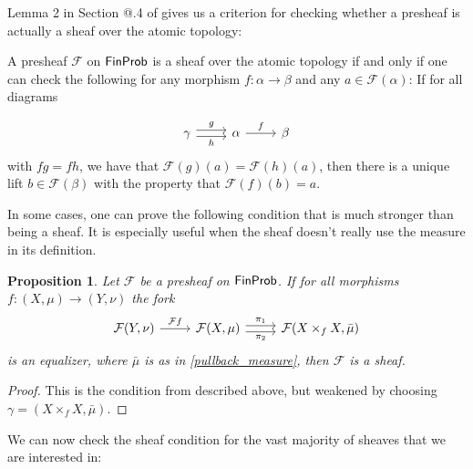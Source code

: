 \documentclass[a4paper]{amsproc}
\makeatletter
\theoremstyle{plain}
\newtheorem{proposition}[theorem]{Proposition}
\theoremstyle{definition}
\theoremstyle{remark}
\numberwithin{equation}{section}
\newcommand{\FinProb}{\textup{\textsf{FinProb}}}
\newcommand{\Rmnum}[1]{\expandafter\@slowromancap\romannumeral #1@}
\makeatother
\begin{document}
Lemma 2 in Section \Rmnum{3}.4 of \cite{maclane2012sheaves} gives us a criterion for checking whether a presheaf is actually a sheaf over the atomic topology:

A presheaf $\mathcal{F}$ on $\FinProb$ is a sheaf over the atomic topology if and only if one can check the following for any morphism $f: \alpha \to \beta$ and any $a \in \mathcal{F}(\alpha)$: If for all diagrams

\[
\begin{tikzcd}
\gamma \arrow[r, "g", shift left] \arrow[r, "h"', shift right] & \alpha \arrow[r, "f"] & \beta
\end{tikzcd}
\]
with $f g = f h$, we have that $\mathcal{F}(g)(a) = \mathcal{F}(h)(a)$, then there is a unique lift $b \in \mathcal{F}(\beta)$ with the property that $\mathcal{F}(f)(b) = a$.

In some cases, one can prove the following condition that is much stronger than being a sheaf. It is especially useful when the sheaf doesn't really use the measure in its definition.

\begin{proposition} \label{sheaf_condition_weak}
Let $\mathcal{F}$ be a presheaf on $\FinProb$. If for all morphisms $f: (X,\mu) \to (Y,\nu)$ the fork
\[
\begin{tikzcd} \mathcal{F} (Y,\nu) \arrow[r, "\mathcal{F}f"] & \mathcal{F} (X,\mu) \arrow[r, "\pi_1", shift left] \arrow[r, "\pi_2"', shift right] & \mathcal{F} (X \times_f X,\bar{\mu})
\end{tikzcd}
\]
is an equalizer, where $\bar{\mu}$ is as in \ref{pullback_measure}, then $\mathcal{F}$ is a sheaf.
\end{proposition}
\begin{proof}
This is the condition from \cite{maclane2012sheaves} described above, but weakened by choosing $\gamma = (X \times_f X,\bar{\mu})$.
\end{proof}


We can now check the sheaf condition for the vast majority of sheaves that we are interested in:
\end{document}

